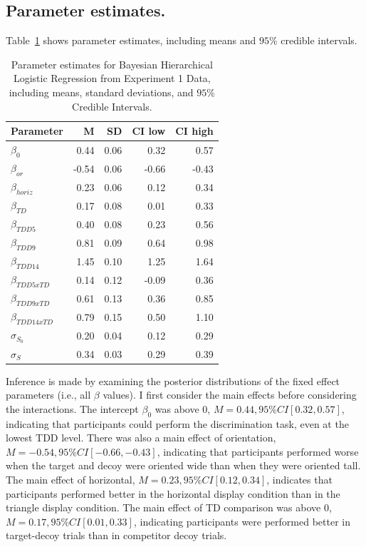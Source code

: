 \subsection{Parameter estimates.}

Table~\ref{tab:e1_params} shows parameter estimates, including means and $95\%$ credible intervals. 
\begin{table}[ht]
    \centering
    \begin{tabular}{lrrrr}
        \toprule
        Parameter & M & SD & CI low & CI high \\
        \midrule
        $\beta_{0}$ & 0.44 & 0.06 & 0.32 & 0.57 \\
        $\beta_{or}$ & -0.54 & 0.06 & -0.66 & -0.43\\
        $\beta_{horiz}$ & 0.23 & 0.06 & 0.12 & 0.34\\
        $\beta_{TD}$ & 0.17 & 0.08 & 0.01 & 0.33\\
        $\beta_{TDD5}$ & 0.40 & 0.08 & 0.23 & 0.56\\
        $\beta_{TDD9}$ & 0.81 & 0.09 & 0.64 & 0.98\\
        $\beta_{TDD14}$ & 1.45 & 0.10 & 1.25 & 1.64\\
        $\beta_{TDD5xTD}$ & 0.14 & 0.12 & -0.09 & 0.36\\
        $\beta_{TDD9xTD}$ & 0.61 & 0.13 & 0.36 & 0.85\\
        $\beta_{TDD14xTD}$ & 0.79 & 0.15 & 0.50 & 1.10\\
        $\sigma_{S_0}$ & 0.20 & 0.04 & 0.12 & 0.29 \\
        $\sigma_{S}$ & 0.34 & 0.03 & 0.29 & 0.39 \\
    \bottomrule 
    \end{tabular}
    \caption{Parameter estimates for Bayesian Hierarchical Logistic Regression from Experiment 1 Data, including means, standard deviations, and $95\%$ Credible Intervals.}
    \label{tab:e1_params}
 \end{table}
    
 Inference is made by examining the posterior distributions of the fixed effect parameters (i.e., all $\beta$ values). I first consider the main effects before considering the interactions. The intercept $\beta_{0}$ was above $0$, $\textit{M}=0.44, 95\%CI [0.32, 0.57]$, indicating that participants could perform the discrimination task, even at the lowest TDD level. There was also a main effect of orientation, $\textit{M}=-0.54, 95\%CI [-0.66, -0.43]$, indicating that participants performed worse when the target and decoy were oriented wide than when they were oriented tall. The main effect of horizontal, $\textit{M}=0.23, 95\%CI [0.12, 0.34]$, indicates that participants performed better in the horizontal display condition than in the triangle display condition. The main effect of TD comparison was above 0, $\textit{M}=0.17, 95\%CI [0.01, 0.33]$, indicating participants were performed better in target-decoy trials than in competitor decoy trials. 

